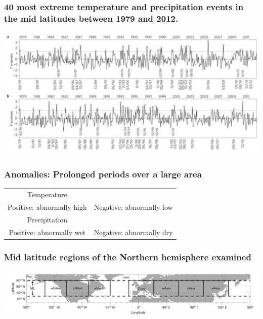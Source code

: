 \documentclass{beamer}
\begin{document}
\begin{frame}
\frametitle{40 most extreme temperature and precipitation events in the mid latitudes between 1979 and 2012.}
\centering
\includegraphics[scale=0.53]{Cathie1}


\end{frame}
\begin{frame}
\frametitle{Anomalies: Prolonged periods over a large area}
\begin{tabular}{c c}
\huge{Temperature}&\vspace{5pt}\\

\Large{Positive: abnormally high}	&	\Large{	Negative: abnormally low}\vspace{20pt}\\

\huge{Precipitation}&\vspace{5pt}\\
\Large{Positive: abnormally wet} &		\Large{	Negative: abnormally dry}\\
\end{tabular}


\end{frame}
\begin{frame}
\frametitle{Mid latitude regions of the Northern hemisphere examined}
\centering
\includegraphics[scale=0.3]{Cathie2}
\end{frame}
\end{document}
